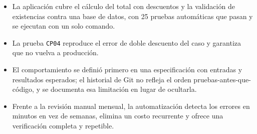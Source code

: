 \documentclass[11pt,a4paper]{article}
\begin{document}
\begin{itemize}
  \item La aplicación cubre el cálculo del total con descuentos y la validación de existencias contra
        una base de datos, con 25 pruebas automáticas que pasan y se ejecutan con un solo comando.
  \item La prueba \texttt{CP04} reproduce el error de doble descuento del caso y garantiza que no vuelva
        a producción.
  \item El comportamiento se definió primero en una especificación con entradas y resultados
        esperados; el historial de Git no refleja el orden pruebas-antes-que-código, y se documenta
        esa limitación en lugar de ocultarla.
  \item Frente a la revisión manual mensual, la automatización detecta los errores en minutos en vez
        de semanas, elimina un costo recurrente y ofrece una verificación completa y repetible.
\end{itemize}
\end{document}
